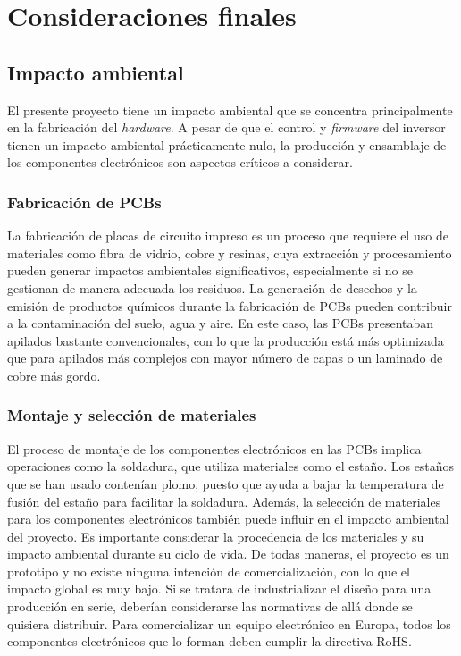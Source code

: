 \chapter{Consideraciones finales}

\section{Impacto ambiental}

El presente proyecto tiene un impacto ambiental que se concentra principalmente en la fabricación del \textit{hardware}. A pesar de que el control y \textit{firmware} del inversor tienen un impacto ambiental prácticamente nulo, la producción y ensamblaje de los componentes electrónicos son aspectos críticos a considerar.

\subsection{Fabricación de PCBs}

La fabricación de placas de circuito impreso es un proceso que requiere el uso de materiales como fibra de vidrio, cobre y resinas, cuya extracción y procesamiento pueden generar impactos ambientales significativos, especialmente si no se gestionan de manera adecuada los residuos. La generación de desechos y la emisión de productos químicos durante la fabricación de PCBs pueden contribuir a la contaminación del suelo, agua y aire. En este caso, las PCBs presentaban apilados bastante convencionales, con lo que la producción está más optimizada que para apilados más complejos con mayor número de capas o un laminado de cobre más gordo.

\subsection{Montaje y selección de materiales}

El proceso de montaje de los componentes electrónicos en las PCBs implica operaciones como la soldadura, que utiliza materiales como el estaño. Los estaños que se han usado contenían plomo, puesto que ayuda a bajar la temperatura de fusión del estaño para facilitar la soldadura. Además, la selección de materiales para los componentes electrónicos también puede influir en el impacto ambiental del proyecto. Es importante considerar la procedencia de los materiales y su impacto ambiental durante su ciclo de vida. De todas maneras, el proyecto es un prototipo y no existe ninguna intención de comercialización, con lo que el impacto global es muy bajo. Si se tratara de industrializar el diseño para una producción en serie, deberían considerarse las normativas de allá donde se quisiera distribuir. Para comercializar un equipo electrónico en Europa, todos los componentes electrónicos que lo forman deben cumplir la directiva RoHS.

